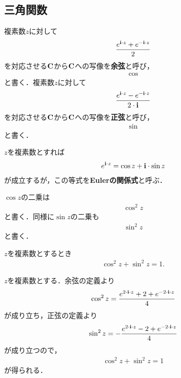 \subsection{三角関数}
	\begin{screen}
		\begin{dfn}[三角関数]
			複素数$z$に対して
			\begin{align}
				\frac{e^{\mathbf{i} \cdot z} + e^{-\mathbf{i} \cdot z}}{2}
			\end{align}
			を対応させる$\mathbf{C}$から$\mathbf{C}$への写像を{\bf 余弦}と呼び，
			\begin{align}
				\cos
			\end{align}
			と書く．複素数$z$に対して
			\begin{align}
				\frac{e^{\mathbf{i} \cdot z} - e^{-\mathbf{i} \cdot z}}{2 \cdot \mathbf{i}}
			\end{align}
			を対応させる$\mathbf{C}$から$\mathbf{C}$への写像を{\bf 正弦}と呼び，
			\begin{align}
				\sin
			\end{align}
			と書く．
		\end{dfn}
	\end{screen}
	
	$z$を複素数とすれば
	\begin{align}
		e^{\mathbf{i} \cdot z} = \cos{z} + \mathbf{i} \cdot \sin{z}
	\end{align}
	が成立するが，この等式を{\bf Eulerの関係式}と呼ぶ．
	
	$\cos{z}$の二乗は
	\begin{align}
		\cos^2{z}
	\end{align}
	と書く．同様に$\sin{z}$の二乗も
	\begin{align}
		\sin^2{z}
	\end{align}
	と書く．
	
	\begin{screen}
		\begin{thm}[余弦と正弦の二乗和は$1$]
			$z$を複素数とするとき
			\begin{align}
				\cos^2{z} + \sin^2{z} = 1.
			\end{align}
		\end{thm}
	\end{screen}
	
	\begin{sketch}
		$z$を複素数とする．余弦の定義より
		\begin{align}
			\cos^2{z} = \frac{e^{2 \cdot \mathbf{i} \cdot z} + 2 + e^{-2 \cdot \mathbf{i} \cdot z}}{4}
		\end{align}
		が成り立ち，正弦の定義より
		\begin{align}
			\sin^2{z} = -\frac{e^{2 \cdot \mathbf{i} \cdot z} - 2 + e^{-2 \cdot \mathbf{i} \cdot z}}{4}
		\end{align}
		が成り立つので，
		\begin{align}
			\cos^2{z} + \sin^2{z} = 1
		\end{align}
		が得られる．
		\QED
	\end{sketch}
	
